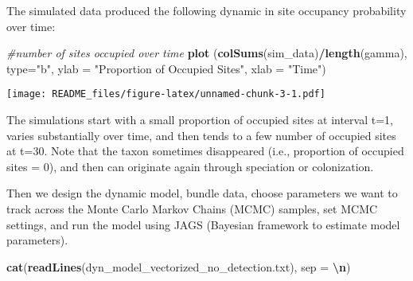 \documentclass[
]{article}
\newenvironment{Shaded}{\begin{snugshade}}{\end{snugshade}}
\newcommand{\AttributeTok}[1]{\textcolor[rgb]{0.13,0.29,0.53}{#1}}
\newcommand{\CommentTok}[1]{\textcolor[rgb]{0.56,0.35,0.01}{\textit{#1}}}
\newcommand{\FunctionTok}[1]{\textcolor[rgb]{0.13,0.29,0.53}{\textbf{#1}}}
\newcommand{\NormalTok}[1]{#1}
\newcommand{\SpecialCharTok}[1]{\textcolor[rgb]{0.81,0.36,0.00}{\textbf{#1}}}
\newcommand{\StringTok}[1]{\textcolor[rgb]{0.31,0.60,0.02}{#1}}
\begin{document}
The simulated data produced the following dynamic in site occupancy
probability over time:

\begin{Shaded}
\begin{Highlighting}[]
\CommentTok{\#number of sites occupied over time}
\FunctionTok{plot}\NormalTok{ (}\FunctionTok{colSums}\NormalTok{(sim\_data)}\SpecialCharTok{/}\FunctionTok{length}\NormalTok{(gamma), }\AttributeTok{type=}\StringTok{"b"}\NormalTok{, }\AttributeTok{ylab =} \StringTok{"Proportion of Occupied Sites"}\NormalTok{, }\AttributeTok{xlab =} \StringTok{"Time"}\NormalTok{)}
\end{Highlighting}
\end{Shaded}

\texttt{[image: README\_files/figure-latex/unnamed-chunk-3-1.pdf]}

The simulations start with a small proportion of occupied sites at
interval t=1, varies substantially over time, and then tends to a few
number of occupied sites at t=30. Note that the taxon sometimes
disappeared (i.e., proportion of occupied sites = 0), and then can
originate again through speciation or colonization.

Then we design the dynamic model, bundle data, choose parameters we want
to track across the Monte Carlo Markov Chains (MCMC) samples, set MCMC
settings, and run the model using JAGS (Bayesian framework to estimate
model parameters).

\begin{Shaded}
\begin{Highlighting}[]
\FunctionTok{cat}\NormalTok{(}\FunctionTok{readLines}\NormalTok{(}\StringTok{\textquotesingle{}dyn\_model\_vectorized\_no\_detection.txt\textquotesingle{}}\NormalTok{), }\AttributeTok{sep =} \StringTok{\textquotesingle{}}\SpecialCharTok{\textbackslash{}n}\StringTok{\textquotesingle{}}\NormalTok{)}
\end{Highlighting}
\end{Shaded}
\end{document}
